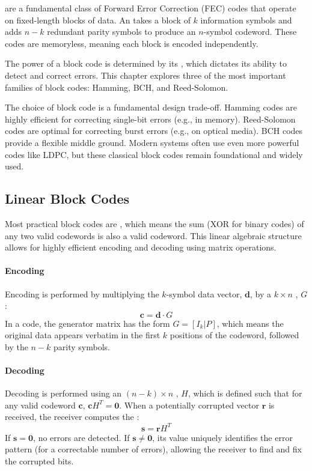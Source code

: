  are a fundamental class of Forward Error Correction (FEC) codes that operate on fixed-length blocks of data. An  takes a block of $k$ information symbols and adds $n-k$ redundant parity symbols to produce an $n$-symbol codeword. These codes are memoryless, meaning each block is encoded independently.

The power of a block code is determined by its , which dictates its ability to detect and correct errors. This chapter explores three of the most important families of block codes: Hamming, BCH, and Reed-Solomon.

\begin{keyconcept}
    The choice of block code is a fundamental design trade-off. Hamming codes are highly efficient for correcting single-bit errors (e.g., in memory). Reed-Solomon codes are optimal for correcting burst errors (e.g., on optical media). BCH codes provide a flexible middle ground. Modern systems often use even more powerful codes like LDPC, but these classical block codes remain foundational and widely used.
\end{keyconcept}


\subsection{Linear Block Codes}

Most practical block codes are , which means the sum (XOR for binary codes) of any two valid codewords is also a valid codeword. This linear algebraic structure allows for highly efficient encoding and decoding using matrix operations.

\paragraph{Encoding}
Encoding is performed by multiplying the $k$-symbol data vector, $\mathbf{d}$, by a $k \times n$ , $G$:
\begin{equation}
    \mathbf{c} = \mathbf{d} \cdot G
\end{equation}
In a  code, the generator matrix has the form $G = [I_k | P]$, which means the original data appears verbatim in the first $k$ positions of the codeword, followed by the $n-k$ parity symbols.

\paragraph{Decoding}
Decoding is performed using an $(n-k) \times n$ , $H$, which is defined such that for any valid codeword $\mathbf{c}$, $\mathbf{c}H^T = \mathbf{0}$. When a potentially corrupted vector $\mathbf{r}$ is received, the receiver computes the :
\begin{equation}
    \mathbf{s} = \mathbf{r}H^T
\end{equation}
If $\mathbf{s} = \mathbf{0}$, no errors are detected. If $\mathbf{s} \neq \mathbf{0}$, its value uniquely identifies the error pattern (for a correctable number of errors), allowing the receiver to find and fix the corrupted bits.


